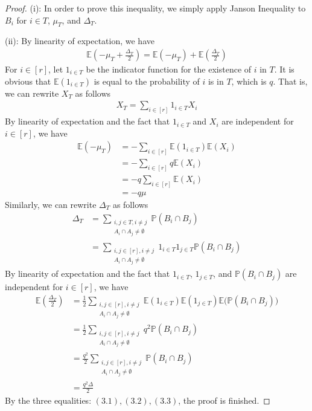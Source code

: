 \begin{proof}
  (i): In order to prove this inequality, we simply apply Janson Inequality to $B_{i}$ for $i \in T$, $\mu_{T}$, and $\Delta_{T}$.

  (ii): By linearity of expectation, we have
  \begin{align*}
    \mathbb{E}(-\mu_{T} + \frac{\Delta_{T}}{2}) = \mathbb{E}(-\mu_{T}) + \mathbb{E}(\frac{\Delta_{T}}{2}) \tag{3.1}
  \end{align*}
  For $i \in [r]$, let $1_{i \in T}$ be the indicator function for the existence of $i$ in $T$. It is obvious that $\mathbb{E}(1_{i \in T})$ is equal to the probability of $i$ is in $T$, which is $q$. That is, we can rewrite $X_{T}$ as follows
  \begin{align*}
    X_{T} = \sum\limits_{i \in [r]} 1_{i \in T} X_{i}
  \end{align*}
  By linearity of expectation and the fact that $1_{i \in T}$ and $X_{i}$ are independent for $i \in [r]$, we have
  \begin{align*}
    \mathbb{E}(-\mu_{T}) &= -\sum\limits_{i \in [r]} \mathbb{E}(1_{i \in T}) \mathbb{E}(X_{i}) \\
            &= -\sum\limits_{i \in [r]} q \mathbb{E}(X_{i}) \\
            &= -q \sum\limits_{i \in [r]} \mathbb{E}(X_{i}) \\
            &= -q \mu \tag{3.2}
  \end{align*}
  Similarly, we can rewrite $\Delta_{T}$ as follows
  \begin{align*}
    \Delta_{T} &= \sum\limits_{\substack{i,j \in T, i \neq j \\ A_{i} \cap A_{j} \neq \emptyset}} \mathbb{P}(B_{i} \cap B_{j}) \\
               &= \sum\limits_{\substack{i,j \in [r], i \neq j \\ A_{i} \cap A_{j} \neq \emptyset}} 1_{i \in T} 1_{j \in T} \mathbb{P}(B_{i} \cap B_{j}) 
  \end{align*}
  By linearity of expectation and the fact that $1_{i \in T}$, $1_{j \in T}$, and $\mathbb{P}(B_{i} \cap B_{j})$ are independent for $i \in [r]$, we have
  \begin{align*}
    \mathbb{E}(\frac{\Delta_{T}}{2}) &= \frac{1}{2} \sum\limits_{\substack{i,j \in [r], i \neq j \\ A_{i} \cap A_{j} \neq \emptyset}} \mathbb{E}(1_{i \in T}) \mathbb{E}(1_{j \in T}) \mathbb{E}\Big(\mathbb{P}(B_{i} \cap B_{j})\Big) \\
                                     &= \frac{1}{2} \sum\limits_{\substack{i,j \in [r], i \neq j \\ A_{i} \cap A_{j} \neq \emptyset}} q^{2} \mathbb{P}(B_{i} \cap B_{j}) \\
                                     &= \frac{q^{2}}{2} \sum\limits_{\substack{i,j \in [r], i \neq j \\ A_{i} \cap A_{j} \neq \emptyset}} \mathbb{P}(B_{i} \cap B_{j}) \\
                                     &= \frac{q^{2} \Delta}{2} \tag{3.4}
  \end{align*}
  By the three equalities: $(3.1), (3.2), (3.3)$, the proof is finished.
\end{proof}
